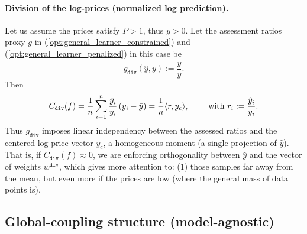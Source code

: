 \documentclass[11pt]{article}
\theoremstyle{plain}
\theoremstyle{definition}
\newcommand{\1}{\mathbf{1}}
\begin{document}
\paragraph{Division of the log-prices (normalized log prediction).}
Let us assume the prices satisfy $P > 1$, thus $y>0$. Let the assessment ratios proxy $g$ in (\ref{opt:general_learner_constrained}) and (\ref{opt:general_learner_penalized}) in this case be
\begin{equation}
\label{eq:g_div}
g_{\texttt{div}}(\hat y,y):=\frac{\hat y}{y}.
\end{equation}
 Then
\begin{equation}
\label{eq:cov_div}
C_{\texttt{div}}(f)
=\frac{1}{n}\sum_{i=1}^n \frac{\hat y_i}{y_i}\,(y_i - \Bar{y}) 
=\frac{1}{n}\langle  r, y_c \rangle,
\qquad \text{ with } r_i:=\frac{\hat{y}_i}{y_i}.
\end{equation}
Thus $g_{\texttt{div}}$ imposes linear independency between the assessed ratios and the centered log-price vector $y_c$, a homogeneous moment (a single projection of $\hat{ y}$). That is, if $C_{\texttt{div}}(f)\approx 0$, we are enforcing orthogonality between $\hat{y}$ and the vector of weights $w^{\texttt{div}}$,  which gives more attention to: (1) those samples far away from the mean, but even more if the prices are low (where the general mass of data points is). 

\subsection{Global-coupling structure (model-agnostic)}
\label{sec:structure}

\begin{table}[htbp]
    \centering
    \caption{Results for val}
    \label{tab:results_val}
\end{table}
\end{document}
